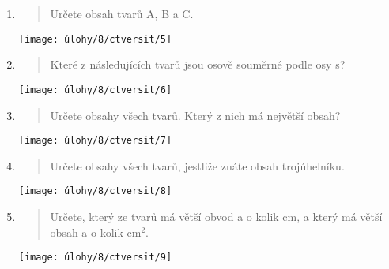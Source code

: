 \begin{enumerate}
\begin{minipage}[t]{\linewidth}
    \end{minipage}

    \item
    \begin{minipage}[t]{\linewidth}
        \begin{quote}
            Určete obsah tvarů A, B a C\@.
        \end{quote}
        \centering
        \texttt{[image: úlohy/8/ctversit/5]}

    \end{minipage}

    \item
    \begin{minipage}[t]{\linewidth}
        \begin{quote}
            Které z následujících tvarů jsou osově souměrné podle osy s?
        \end{quote}
        \centering
        \texttt{[image: úlohy/8/ctversit/6]}

    \end{minipage}

    \item
    \begin{minipage}[t]{\linewidth}
        \begin{quote}
            Určete obsahy všech tvarů.
            Který z nich má největší obsah?
        \end{quote}
        \centering
        \texttt{[image: úlohy/8/ctversit/7]}

    \end{minipage}

    \item
    \begin{minipage}[t]{\linewidth}
        \begin{quote}
            Určete obsahy všech tvarů, jestliže znáte obsah trojúhelníku.
        \end{quote}
        \centering
        \texttt{[image: úlohy/8/ctversit/8]}

    \end{minipage}

    \item
    \begin{minipage}[t]{\linewidth}
        \begin{quote}
            Určete, který ze tvarů má větší obvod a o kolik cm, a který má větší obsah a o kolik cm$^{2}$.
        \end{quote}
        \centering
        \texttt{[image: úlohy/8/ctversit/9]}


\end{minipage}
\end{enumerate}
